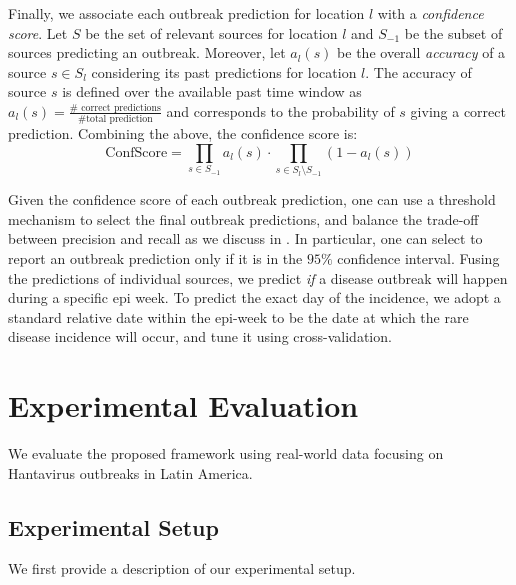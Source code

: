 \documentclass[twoside,leqno,twocolumn]{article}
\newcommand{\fullmodel}{{{\sf SourceSeer}}\xspace}
\begin{document}
Finally, we associate each outbreak prediction for location $l$ with a {\em confidence score}. Let $S$ be the set of relevant sources for location $l$ and $S_{-1}$ be the subset of sources predicting an outbreak. Moreover, let $a_l(s)$ be the overall {\em accuracy} of a source $s \in S_l$ considering its past predictions for location $l$. The accuracy of source $s$ is defined over the available past time window as $a_l(s) = \frac{\#\mbox{ correct predictions}}{\#\mbox{total prediction}}$ and corresponds to the probability of $s$ giving a correct prediction. Combining the above, the confidence score is: 
{\small \begin{equation}
\textrm{ConfScore} = \prod_{s \in S_{-1}}a_l(s) \cdot \prod_{s \in S_l \setminus S_{-1}} (1 - a_l(s))
\label{eq:conf}
\end{equation}}
\vspace{-10pt}

\noindent Given the confidence score of each outbreak prediction, one can use a threshold mechanism to select the final outbreak predictions, and balance the trade-off between precision and recall as we discuss in . In particular, one can select to report an outbreak prediction only if it is in the $95\%$ confidence interval. Fusing the predictions of individual sources, we predict  {\em if} a disease outbreak will happen during a specific epi week. To predict the exact day of the incidence, we adopt a standard relative date within the epi-week to be the date at which the rare disease incidence will occur, and tune it using cross-validation. 

\section{Experimental Evaluation}
\label{sec:exp}
We evaluate the proposed framework using real-world data focusing on Hantavirus outbreaks in Latin America.

\subsection{Experimental Setup} We first provide a description of our experimental setup.
\end{document}
